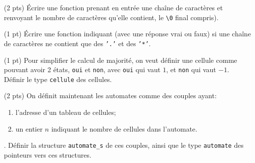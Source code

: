 \vspace*{1em}

\question (2 pts) Écrire une fonction prenant en entrée une chaîne de
caractères et renvoyant le nombre de caractères qu'elle contient, le
\texttt{\textbackslash 0} final compris).

\question (1 pt) Écrire une fonction indiquant (avec une réponse vrai
ou faux) si une chaîne de caractères ne contient que des \texttt{'.'}
et des \texttt{'*'}.

\question (1 pt) Pour simplifier le calcul de majorit{\'e}, on veut d{\'e}finir
une cellule comme pouvant avoir 2 {\'e}tats, \texttt{oui} et
\texttt{non}, avec \texttt{oui} qui vaut $1$, et \texttt{non} qui vaut
$-1$. D{\'e}finir le type \texttt{cellule} des cellules.


\question (2 pts) On d{\'e}finit maintenant les automates comme des couples ayant:
\begin{enumerate}
\item l'adresse d'un tableau de cellules;
\item un entier $n$ indiquant le nombre de cellules dans l'automate.
\end{enumerate}.
D{\'e}finir la structure \texttt{automate\_s} de ces couples, ainsi que le type 
\texttt{automate} des pointeurs vers ces structures.


